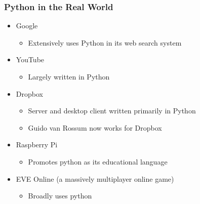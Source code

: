 \documentclass[mini frame in current subsection]{beamer}
\begin{document}
		\begin{frame}
			\frametitle{Python in the Real World}
			\begin{itemize}
				\vfill \item  Google
					\begin{itemize}
						\item  Extensively uses Python in its web search system
					\end{itemize}
				\vfill \item  YouTube
					\begin{itemize}
						\item  Largely written in Python
					\end{itemize}
				\vfill \item  Dropbox
					\begin{itemize}
						\item  Server and desktop client written primarily in Python
						\item  Guido van Rossum now works for Dropbox
					\end{itemize}
				\vfill \item  Raspberry Pi
					\begin{itemize}
						\item  Promotes python as its educational language
					\end{itemize}
				\vfill \item  EVE Online (a massively multiplayer online game)
					\begin{itemize}
						\item  Broadly uses python
					\end{itemize}
			\end{itemize}
		\end{frame}
	
\end{document}
